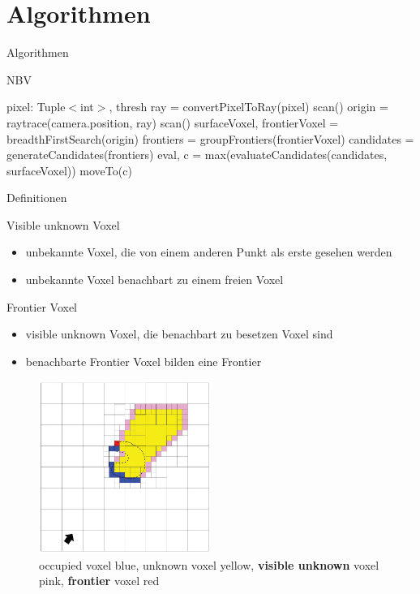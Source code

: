 \documentclass{beamer}
\begin{document}
\section{Algorithmen}
\begin{frame}{Algorithmen}
	\begin{algorithm}[H]
		\caption{NBV}
		\begin{algorithmic}[1]
			\Require pixel: Tuple$<$int$ >$, thresh
			\State ray = convertPixelToRay(pixel)
			\State scan()
			\State origin = raytrace(camera.position, ray)
			\State scan()
			\State surfaceVoxel, frontierVoxel =  breadthFirstSearch(origin)
			\State frontiers = groupFrontiers(frontierVoxel)
			\State candidates = generateCandidates(frontiers)
			\State eval, c = max(evaluateCandidates(candidates, surfaceVoxel))
			\State moveTo(c)
			\EndWhile
		\end{algorithmic}
	\end{algorithm}
\end{frame}
\begin{frame}{Definitionen}
	\begin{exampleblock}{Visible unknown Voxel}
		\begin{itemize}
			\item unbekannte Voxel, die von einem anderen Punkt als erste gesehen werden
			\item unbekannte Voxel benachbart zu einem freien Voxel
		\end{itemize}
		\cite{vasquez-gomez_vpl_2020}
	\end{exampleblock}
	\begin{exampleblock}{Frontier Voxel}
		\begin{itemize}
			\item visible unknown Voxel, die benachbart zu besetzen Voxel sind
			\item benachbarte Frontier Voxel bilden eine Frontier

		\end{itemize}
		\cite{vasquez-gomez_vpl_2020}
	\end{exampleblock}
\end{frame}

\begin{frame}{}
	\centering
	\begin{figure}
		\includegraphics[width=0.5\textwidth]{Graphics/vasquez.png}
		\caption{occupied voxel blue, unknown voxel yellow, \textbf{visible unknown} voxel pink, \textbf{frontier} voxel red \cite{vasquez-gomez_vpl_2020}}
	\end{figure}
\end{frame}
\end{document}
